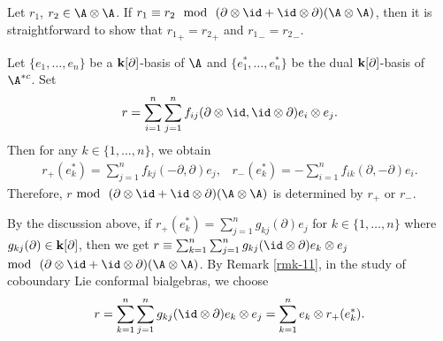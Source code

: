 \documentclass[12pt]{amsart}
\begin{document}
\begin{remark}\label{rmk-2}
Let $r_1$, $r_2\in \A\otimes \A$. If $r_1\equiv r_2
~~\text{mod}~~(\partial\otimes \id+\id\otimes
\partial)(\A\otimes\A)$, then it is straightforward to show that
${r_1}_+={r_2}_+$ and ${r_1}_-={r_2}_-$.

Let $\{e_1, \ldots, e_n\}$ be a ${\bf k}[\partial]$-basis of $\A$
and $\{e_1^\ast, \ldots, e_n^\ast\}$ be the dual ${\bf
k}[\partial]$-basis of $\A^{\ast c}$. %
Set
$$r=\sum_{i=1}^n\sum_{j=1}^nf_{ij}(\partial\otimes \id,\id\otimes
\partial)e_i\otimes e_j.$$ Then for any $k\in \{1, \ldots, n\}$,
we obtain
\begin{eqnarray}
r_+(e_k^\ast)=\sum_{j=1}^nf_{kj}(-\partial, \partial)e_j,\;\;\;r_-(e_k^\ast)=-\sum_{i=1}^nf_{ik}(\partial, -\partial)e_i.
\end{eqnarray}
Therefore, $r$ $\text{mod}~~(\partial\otimes \id+\id\otimes \partial)(\A\otimes\A)$ is determined by $r_+$ or $r_-$.

By the discussion above, if
$r_+(e_k^\ast)=\sum_{j=1}^ng_{kj}(\partial)e_j$ for $k\in \{1,
\ldots, n\}$ where $g_{kj}(\partial)\in {\bf k}[\partial]$, then
we get $r\equiv \sum_{k=1}^n\sum_{j=1}^ng_{kj}(\id\otimes
\partial)e_k\otimes e_j$ $\text{mod}~~(\partial\otimes
\id+\id\otimes \partial)(\A\otimes\A)$. By Remark \ref{rmk-11}, in
the study of coboundary Lie conformal bialgebras, we choose
$$r=\sum_{k=1}^n\sum_{j=1}^ng_{kj}(\id\otimes \partial)e_k\otimes
e_j=\sum_{k=1}^n e_k\otimes r_+(e_k^*).$$%
\end{remark}
 
\end{document}

